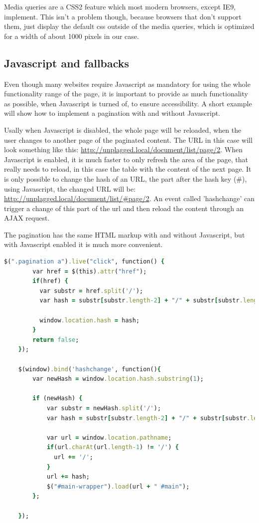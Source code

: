 Media queries are a CSS2 feature which most modern browsers, except IE9, implement. This isn't a problem though, because 
browsers that don't 
support them, just display the default css outside of the media queries, which is optimized for a width of about 1000 pixels 
in our case.

\subsection{Javascript and fallbacks}

Even though many websites require Javascript as mandatory for using the whole functionality range of the page, it is 
important to provide as much functionality as possible, when Javascript is turned of, to ensure accessibility\citep[page 323]{Zeldman2010}.
A short example will show how 
to implement a pagination with and without Javascript.

Usally when Javascript is disabled, the whole page will be reloaded, when the user changes to another page of the paginated content. The URL in this case will look something like this: \url{http://unplagged.local/document/list/page/2}. When Javascript is enabled, it is much faster to only refresh the area of the page, that really needs to reload, in this case the table with the content of the next page. It is only possible to change the hash of an URL, the part after the hash key (\#), using Javascript, the changed URL will be: \url{http://unplagged.local/document/list/#page/2}. An event called 'hashchange' can trigger a change of this part of the url and then reload the content through an AJAX request.

The pagination has the same HTML markup with and without Javascript, but with Javascript enabled it is much more convenient.

\begin{lstlisting}[caption=Javascript Pagination, label=list:cssMediaQuery, language=Ruby]
$(".pagination a").live("click", function() {
        var href = $(this).attr("href");
        if(href) {
          var substr = href.split('/');
          var hash = substr[substr.length-2] + "/" + substr[substr.length-1];

          window.location.hash = hash;
        }
        return false;
    });
    
    $(window).bind('hashchange', function(){
        var newHash = window.location.hash.substring(1);
        
        if (newHash) {
            var substr = newHash.split('/');
            var hash = substr[substr.length-2] + "/" + substr[substr.length-1];
            
            var url = window.location.pathname;
            if(url.charAt(url.length-1) != '/') {
              url += '/';
            }
            url += hash;
            $("#main-wrapper").load(url + " #main");
        };
        
    });
\end{lstlisting}


